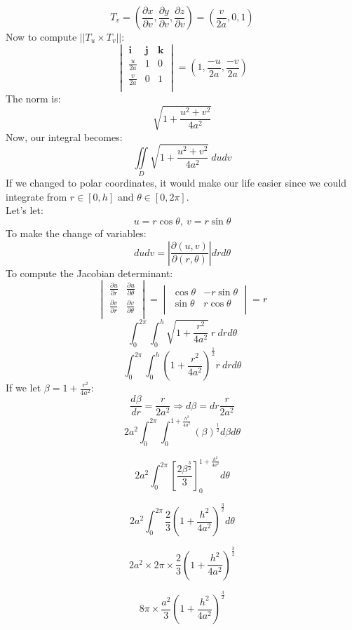 \documentclass[12pt]{article}
\newcommand{\vect}[1]{\boldsymbol{#1}}
\begin{document}
$$
T_v=\left( \frac{\partial x}{\partial v},  \frac{\partial y}{\partial v},  \frac{\partial z}{\partial v} \right)
=\left( \frac{v}{2a},  0,  1 \right)
$$
Now to compute $||T_u \times T_v||$:
$$
\begin{vmatrix}
	\vect{i} & \vect{j} & \vect{k} \\
	\frac{u}{2a} & 1 & 0 \\
	\frac{v}{2a} & 0 & 1 \\
\end{vmatrix}
=
\left(
1,
\frac{-u}{2a},
\frac{-v}{2a}
\right)
$$
The norm is:
$$
\sqrt{1+\frac{u^2+v^2}{4a^2}}
$$
Now, our integral becomes:
$$
	\iint\limits_{D}\sqrt{1+\frac{u^2+v^2}{4a^2}} \ du dv
$$
If we changed to polar coordinates, it would make our life easier since we could integrate from $r\in [0, h]$ and $\theta \in [0, 2\pi]$.\\
Let's let:
$$
u=r\cos \theta, \ v=r\sin \theta
$$
To make the change of variables:
$$
du dv = \left| \frac{\partial (u, v)}{\partial (r, \theta) } \right|dr d\theta
$$
To compute the Jacobian determinant:
$$
\begin{vmatrix}
	\frac{\partial u}{\partial r} & \frac{\partial u}{\partial \theta} \\
	\frac{\partial v}{\partial r} & \frac{\partial v}{\partial \theta} \\
\end{vmatrix}
=
\begin{vmatrix}
	\cos \theta & -r \sin \theta \\
	\sin \theta & r \cos \theta \\
\end{vmatrix}
=r
$$
$$
	\int_{0}^{2\pi}\int_{0}^{h}\sqrt{1+\frac{r^2}{4a^2}} \ r \ dr d\theta
$$
$$
	\int_{0}^{2\pi}\int_{0}^{h}\left(1+\frac{r^2}{4a^2}\right)^{\frac{1}{2}} r \ dr d\theta
$$
If we let $\beta =1+\frac{r^2}{4a^2}$:
$$
\frac{d \beta}{d r} = \frac{r}{2a^2} 
\Rightarrow
d \beta=dr \frac{r}{2a^2}
$$
$$
	2a^2\int_{0}^{2\pi}\int_{0}^{1+\frac{h^2}{4a^2}}\left(\beta\right)^{\frac{1}{2}} d\beta d\theta
$$

$$
	2a^2\int_{0}^{2\pi}\left[\frac{2\beta^{\frac{3}{2}}}{3} \right]^{1+\frac{h^2}{4a^2}}_{0} d\theta
$$

$$
	2a^2\int_{0}^{2\pi}\frac{2}{3} \left( 1+\frac{h^2}{4a^2} \right)^{\frac{3}{2}} d\theta
$$

$$
	2a^2 \times 2\pi \times \frac{2}{3} \left( 1+\frac{h^2}{4a^2} \right)^{\frac{3}{2}}
$$

$$
	8\pi \times \frac{a^2}{3} \left( 1 +\frac{h^2}{4a^2} \right)^{\frac{3}{2}}
$$
\end{document}
